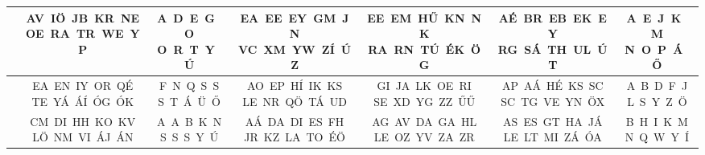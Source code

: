 \documentclass[11pt]{extarticle}
\begin{document}
\begin{center}
\begin{tabular}{|lcccccc|}
\textbf{\rule{0pt}{3.4ex}2. terem\rule[-1.4ex]{0pt}{0pt}} & \shortstack{\rule{0pt}{3.4ex}AV~IÖ~JB~KR~NE \\ OE~RA~TR~WE~YP\rule[-1.4ex]{0pt}{0pt}} & \shortstack{\rule{0pt}{3.4ex}A~D~E~G~O \\ O~R~T~Y~Ú\rule[-1.4ex]{0pt}{0pt}} & \shortstack{\rule{0pt}{3.4ex}EA~EE~EY~GM~JN \\ VC~XM~YW~ZÍ~ÚZ\rule[-1.4ex]{0pt}{0pt}} & \shortstack{\rule{0pt}{3.4ex}EE~EM~HŰ~KN~NK \\ RA~RN~TÚ~ÉK~ÖG\rule[-1.4ex]{0pt}{0pt}} & \shortstack{\rule{0pt}{3.4ex}AÉ~BR~EB~EK~EY \\ RG~SÁ~TH~UL~ÚT\rule[-1.4ex]{0pt}{0pt}} & \shortstack{\rule{0pt}{3.4ex}A~E~J~K~M \\ N~O~P~Á~Ő\rule[-1.4ex]{0pt}{0pt}} \\ \hline
\textbf{\rule{0pt}{3.4ex}3. terem\rule[-1.4ex]{0pt}{0pt}} & \shortstack{\rule{0pt}{3.4ex}EA~EN~IY~OR~QÉ \\ TE~YÁ~ÁÍ~ÓG~ÓK\rule[-1.4ex]{0pt}{0pt}} & \shortstack{\rule{0pt}{3.4ex}F~N~Q~S~S \\ S~T~Á~Ü~Ő\rule[-1.4ex]{0pt}{0pt}} & \shortstack{\rule{0pt}{3.4ex}AO~EP~HÍ~IK~KS \\ LE~NR~QÖ~TÁ~UD\rule[-1.4ex]{0pt}{0pt}} & \shortstack{\rule{0pt}{3.4ex}GI~JA~LK~OE~RI \\ SE~XD~YG~ZZ~ŰŰ\rule[-1.4ex]{0pt}{0pt}} & \shortstack{\rule{0pt}{3.4ex}AP~AÁ~HÉ~KS~SC \\ SC~TG~VE~YN~ÖX\rule[-1.4ex]{0pt}{0pt}} & \shortstack{\rule{0pt}{3.4ex}A~B~D~F~J \\ L~S~Y~Z~Ö\rule[-1.4ex]{0pt}{0pt}} \\ \hline
\textbf{\rule{0pt}{3.4ex}4. terem\rule[-1.4ex]{0pt}{0pt}} & \shortstack{\rule{0pt}{3.4ex}CM~DI~HH~KO~KV \\ LÖ~NM~VI~ÁJ~ÁN\rule[-1.4ex]{0pt}{0pt}} & \shortstack{\rule{0pt}{3.4ex}A~A~B~K~N \\ S~S~S~Y~Ú\rule[-1.4ex]{0pt}{0pt}} & \shortstack{\rule{0pt}{3.4ex}AÁ~DA~DI~ES~FH \\ JR~KZ~LA~TO~ÉÖ\rule[-1.4ex]{0pt}{0pt}} & \shortstack{\rule{0pt}{3.4ex}AG~AV~DA~GA~HL \\ LE~OZ~YV~ZA~ZR\rule[-1.4ex]{0pt}{0pt}} & \shortstack{\rule{0pt}{3.4ex}AS~ES~GT~HA~JÁ \\ LE~LT~MI~ZÁ~ÓA\rule[-1.4ex]{0pt}{0pt}} & \shortstack{\rule{0pt}{3.4ex}B~H~I~K~M \\ N~Q~W~Y~Í\rule[-1.4ex]{0pt}{0pt}} \\ \hline

\end{tabular}
\end{center}
\end{document}
